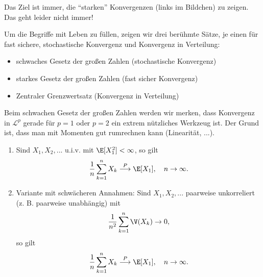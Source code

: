 \begin{bem}
	Das Ziel ist immer, die \enquote{starken} Konvergenzen (links im Bildchen) zu zeigen. Das geht leider nicht immer!
\end{bem}
Um die Begriffe mit Leben zu f\"ullen, zeigen wir drei ber\"uhmte S\"atze, je einen f\"ur fast sichere, stochastische Konvergenz und Konvergenz in Verteilung:
\begin{itemize}
	\item schwaches Gesetz der gro\ss en Zahlen (stochastische Konvergenz)
	\item starkes Gesetz der gro\ss en Zahlen (fast sicher Konvergenz)
	\item Zentraler Grenzwertsatz (Konvergenz in Verteilung)
\end{itemize}
Beim schwachen Gesetz der gro\ss en Zahlen werden wir merken, dass Konvergenz in $\mathcal L^p$ gerade f\"ur $p=1$ oder $p=2$ ein extrem n\"utzliches Werkzeug ist. Der Grund ist, dass man mit Momenten gut rumrechnen kann (Linearit\"at, ...). 

\begin{satz}\label{schwaches}\abs
	\begin{enumerate}[label=(\roman*)]
		\item Sind $X_1,X_2,...$ u.i.v. mit $\E[X_1^2] < \infty$, so gilt
		\[ \frac{1}{n} \sum_{k=1}^{n} X_k \overset{P}{\longrightarrow} \E[X_1], \quad n \to \infty. \]
		\item Variante mit schw\"acheren Annahmen: Sind $X_1,X_2,...$ paarweise unkorreliert (z. B. paarweise unabh\"angig) mit 
		\begin{align}
		 \frac{1}{n^2} \sum\limits_{k=1}^{n} \V(X_k) \to 0, \label{F1}
		\end{align}
		so gilt
		\[ \frac{1}{n} \sum_{k=1}^{n} X_k \overset{P}{\longrightarrow} \E[X_1], \quad n \to \infty. \]
	\end{enumerate}
\end{satz}

